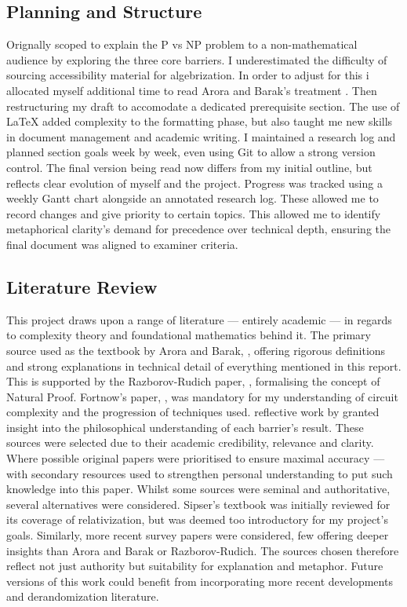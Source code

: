 \documentclass[12pt]{report}
\begin{document}
\subsection*{Planning and Structure}
Orignally scoped to explain the P vs NP problem to a non-mathematical audience by exploring the three core barriers.
I underestimated the difficulty of sourcing accessibility material for algebrization.
In order to adjust for this i allocated myself additional time to read Arora and Barak's treatment \cite{arora2008algebrization}.
Then restructuring my draft to accomodate a dedicated prerequisite section.
The use of LaTeX added complexity to the formatting phase, but also taught me new skills in document management and academic writing.
I maintained a research log and planned section goals week by week, even using Git to allow a strong version control.
The final version being read now differs from my initial outline, but reflects clear evolution of myself and the project.
Progress was tracked using a weekly Gantt chart alongside an annotated research log.
These allowed me to record changes and give priority to certain topics.
This allowed me to identify metaphorical clarity's demand for precedence over technical depth, ensuring the final document was aligned to examiner criteria.

\subsection*{Literature Review}
This project draws upon a range of literature --- entirely academic --- in regards to complexity theory and foundational mathematics behind it.
The primary source used as the textbook by Arora and Barak, \cite{arora2009}, offering rigorous definitions and strong explanations in technical detail of everything mentioned in this report.
This is supported by the Razborov-Rudich paper, \cite{razborov1994}, formalising the concept of Natural Proof.
Fortnow's paper, \cite{fortnow2009status}, was mandatory for my understanding of circuit complexity and the progression of techniques used.
reflective work by \cite{aaronson2005philosophers} granted insight into the philosophical understanding of each barrier's result.
These sources were selected due to their academic credibility, relevance and clarity.
Where possible original papers were prioritised to ensure maximal accuracy ---  with secondary resources used to strengthen personal understanding to put such knowledge into this paper.
Whilst some sources were seminal and authoritative, several alternatives were considered.
Sipser's textbook was initially reviewed for its coverage of relativization, but was deemed too introductory for my project's goals.
Similarly, more recent survey papers were considered, few offering deeper insights than Arora and Barak or Razborov-Rudich.
The sources chosen therefore reflect not just authority but suitability for explanation and metaphor.
Future versions of this work could benefit from incorporating more recent developments and derandomization literature.
\end{document}
